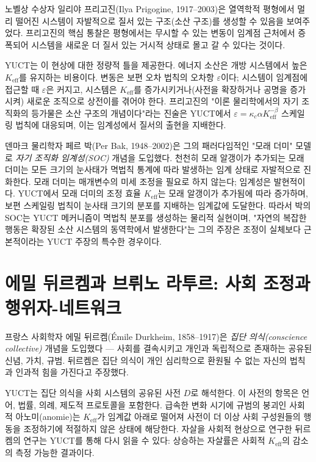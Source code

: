 \documentclass[12pt,a4paper]{article}
\begin{document}
	노벨상 수상자 일리야 프리고진(Ilya Prigogine, 1917–2003)은 열역학적 평형에서 멀리 떨어진 시스템이 자발적으로 질서 있는 구조(소산 구조)를 생성할 수 있음을 보여주었다. 프리고진의 핵심 통찰은 평형에서는 무시할 수 있는 변동이 임계점 근처에서 증폭되어 시스템을 새로운 더 질서 있는 거시적 상태로 몰고 갈 수 있다는 것이다.
	
	YUCT는 이 현상에 대한 정량적 틀을 제공한다. 에너지 소산은 개방 시스템에서 높은 \(K_{\mathrm{eff}}\)를 유지하는 비용이다. 변동은 보편 오차 법칙의 오차항 \(\varepsilon\)이다; 시스템이 임계점에 접근할 때 \(\varepsilon\)은 커지고, 시스템은 \(K_{\mathrm{eff}}\)를 증가시키거나(사전을 확장하거나 공명을 증가시켜) 새로운 조직으로 상전이를 겪어야 한다. 프리고진의 "이론 물리학에서의 자기 조직화의 등가물은 소산 구조의 개념이다"라는 진술은 YUCT에서 \(\varepsilon = \kappa_c \alpha K_{\mathrm{eff}}^{-\beta}\) 스케일링 법칙에 대응되며, 이는 임계성에서 질서의 출현을 지배한다.
	
	덴마크 물리학자 페르 박(Per Bak, 1948–2002)은 그의 패러다임적인 "모래 더미" 모델로 \emph{자기 조직화 임계성(SOC)} 개념을 도입했다. 천천히 모래 알갱이가 추가되는 모래 더미는 모든 크기의 눈사태가 멱법칙 통계에 따라 발생하는 임계 상태로 자발적으로 진화한다. 모래 더미는 매개변수의 미세 조정을 필요로 하지 않는다; 임계성은 발현적이다. YUCT에서 모래 더미의 조정 효율 \(K_{\mathrm{eff}}\)는 모래 알갱이가 추가됨에 따라 증가하며, 보편 스케일링 법칙이 눈사태 크기의 분포를 지배하는 임계값에 도달한다. 따라서 박의 SOC는 YUCT 메커니즘이 멱법칙 분포를 생성하는 물리적 실현이며, "자연의 복잡한 행동은 확장된 소산 시스템의 동역학에서 발생한다"는 그의 주장은 조정이 실체보다 근본적이라는 YUCT 주장의 특수한 경우이다.
	
	\section{에밀 뒤르켐과 브뤼노 라투르: 사회 조정과 행위자-네트워크}
	
	프랑스 사회학자 에밀 뒤르켐(Émile Durkheim, 1858–1917)은 \emph{집단 의식(conscience collective)} 개념을 도입했다 — 사회를 결속시키고 개인과 독립적으로 존재하는 공유된 신념, 가치, 규범. 뒤르켐은 집단 의식이 개인 심리학으로 환원될 수 없는 자신의 법칙과 인과적 힘을 가진다고 주장했다.
	
	YUCT는 집단 의식을 사회 시스템의 공유된 사전 \(D\)로 해석한다. 이 사전의 항목은 언어, 법률, 의례, 제도적 프로토콜을 포함한다. 급속한 변화 시기에 규범의 붕괴인 사회적 아노미(anomie)는 \(K_{\mathrm{eff}}\)가 임계값 아래로 떨어져 사전이 더 이상 사회 구성원들의 행동을 조정하기에 적절하지 않은 상태에 해당한다. 자살을 사회적 현상으로 연구한 뒤르켐의 연구는 YUCT를 통해 다시 읽을 수 있다: 상승하는 자살률은 사회적 \(K_{\mathrm{eff}}\)의 감소의 측정 가능한 결과이다.
	
\end{document}
